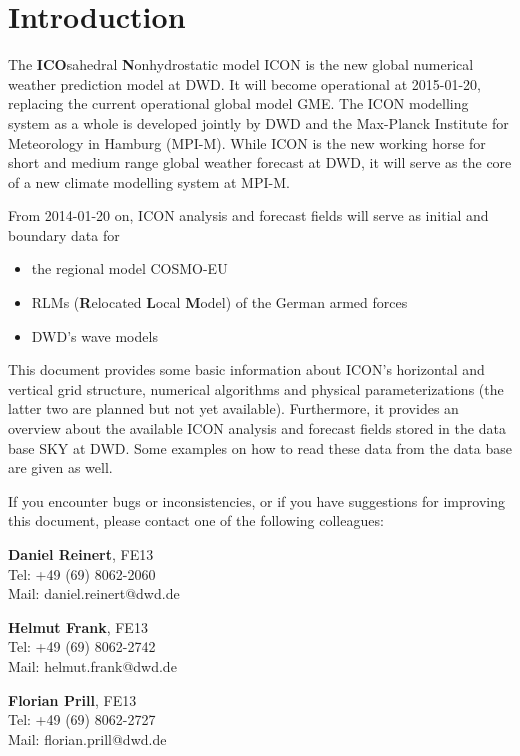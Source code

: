 \chapter{Introduction}

The \textbf{ICO}sahedral \textbf{N}onhydrostatic model ICON is the new global numerical 
weather prediction model at DWD. It will become operational at 2015-01-20, replacing the current 
operational global model GME. The ICON modelling system as a whole is developed jointly by DWD and the 
Max-Planck Institute for Meteorology in Hamburg (MPI-M). While ICON is the new working horse 
for short and medium range global weather forecast at DWD, it will serve as the core of a new climate 
modelling system at MPI-M.

From 2014-01-20 on, ICON analysis and forecast fields will serve as initial and boundary data for
\begin{itemize}
 \item the regional model COSMO-EU
 \item RLMs (\textbf{R}elocated \textbf{L}ocal \textbf{M}odel) of the German armed forces
 \item DWD's wave models
\end{itemize}

This document provides some basic information about ICON's horizontal and vertical grid structure, 
numerical algorithms and physical parameterizations (the latter two are planned but not yet available). 
Furthermore, it provides an overview about the available ICON analysis and forecast fields stored in the 
data base SKY at DWD. Some examples on how to read these data from the data base are given as well.

\newpage
If you encounter bugs or inconsistencies, or if you have suggestions for improving this document, 
please contact one of the following colleagues:

\begin{note}
\begin{minipage}{\textwidth}
\centering
\begin{minipage}{0.32\textwidth}
 \textbf{Daniel Reinert}, FE13 \\
 Tel: +49 (69) 8062-2060 \\ 
 Mail: daniel.reinert@dwd.de
\end{minipage}
\begin{minipage}{0.32\textwidth}
 \textbf{Helmut Frank}, FE13\\
 Tel: +49 (69) 8062-2742 \\ 
 Mail: helmut.frank@dwd.de
\end{minipage}
\begin{minipage}{0.32\textwidth}
 \textbf{Florian Prill}, FE13 \\
 Tel: +49 (69) 8062-2727 \\ 
 Mail: florian.prill@dwd.de
\end{minipage}
\end{minipage}
\end{note}  
